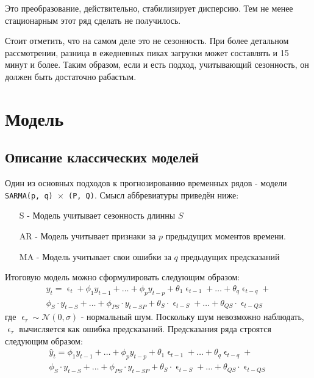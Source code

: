 \documentclass[14pt, a4paper]{extarticle}
\begin{document}
	Это преобразование, действительно, стабилизирует дисперсию. Тем не менее стационарным этот ряд сделать не получилось. 

	Стоит отметить, что на самом деле это не сезонность.
	При более детальном рассмотрении, разница в ежедневных пиках загрузки может составлять и 15 минут и более. 
	Таким образом, если и есть подход, учитывающий сезонность, он должен быть достаточно рабастым.
	
	\section{Модель}
	\subsection{Описание классических моделей}
	Один из основных подходов к прогнозированию временных рядов - модели \texttt{SARMA(p, q) $\times$ (P, Q)}. Смысл аббревиатуры приведён ниже:
	\begin{enumerate}
		\item [S -] Модель учитывает сезонность длинны $S$
		\item [AR -] Модель учитывает признаки за $p$ предыдущих моментов времени.
		\item [MA -] Модель учитывает свои ошибки за $q$ предыдущих предсказаний
	\end{enumerate}
	Итоговую модель можно сформулировать следующим образом:
	\begin{align}
		y_t =\upvarepsilon_{t} + \phi_1y_{t-1} + \dots + \phi_py_{t-p} + \theta_1 \upvarepsilon_{t-1} + \dots + \theta_q \upvarepsilon_{t-q} + \nonumber \\
		\phi_S\cdot y_{t-S} + \dots + \phi_{PS} \cdot y_{t-SP} + \theta_S \cdot \upvarepsilon_{t-S} + \dots + \theta_{QS} \cdot \upvarepsilon_{t-QS} \nonumber
	\end{align}
	где $\upvarepsilon_{\tau} \sim \mathcal{N}(0, \sigma)$ - нормальный шум. Поскольку шум невозможно наблюдать, $\upvarepsilon_{\tau}$ вычисляется как ошибка предсказаний. Предсказания ряда строятся следующим образом:
	\begin{align}
	\hat{y}_t = \phi_1y_{t-1} + \dots + \phi_py_{t-p} + \theta_1 \upvarepsilon_{t-1} + \dots + \theta_q \upvarepsilon_{t-q} + \nonumber \\
	\phi_S\cdot y_{t-S} + \dots + \phi_{PS} \cdot y_{t-SP} + \theta_S \cdot \upvarepsilon_{t-S} + \dots + \theta_{QS} \cdot \upvarepsilon_{t-QS} \label{SARMA_est}
	\end{align}
	
\end{document}
